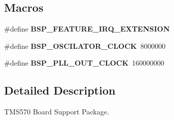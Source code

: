\subsection*{Macros}
\begin{DoxyCompactItemize}
\item 
\mbox{\label{group__RTEMSBSPsARMTMS570_ga5d7d631d3a14b7554160f14eb42f351b}} 
\#define {\bfseries B\+S\+P\+\_\+\+F\+E\+A\+T\+U\+R\+E\+\_\+\+I\+R\+Q\+\_\+\+E\+X\+T\+E\+N\+S\+I\+ON}
\item 
\mbox{\label{group__RTEMSBSPsARMTMS570_ga02c8c24e3de8a904908c465ab167c68b}} 
\#define {\bfseries B\+S\+P\+\_\+\+O\+S\+C\+I\+L\+A\+T\+O\+R\+\_\+\+C\+L\+O\+CK}~8000000
\item 
\mbox{\label{group__RTEMSBSPsARMTMS570_ga5d6923cdd178dd5476a0f789e08e324f}} 
\#define {\bfseries B\+S\+P\+\_\+\+P\+L\+L\+\_\+\+O\+U\+T\+\_\+\+C\+L\+O\+CK}~160000000
\end{DoxyCompactItemize}


\subsection{Detailed Description}
T\+M\+S570 Board Support Package. 


